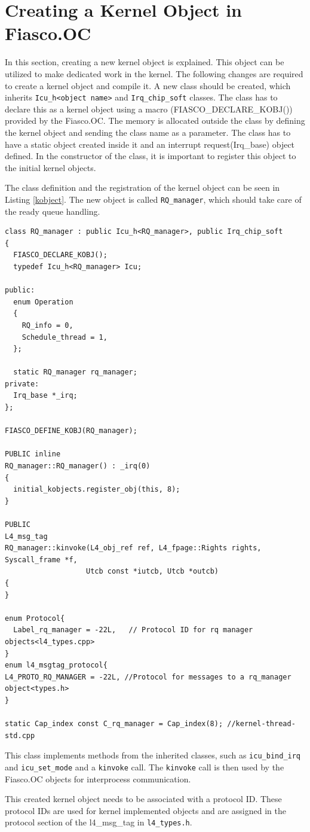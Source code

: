 \section{Creating a Kernel Object in Fiasco.OC}\label{implement:kernelobject}
In this section, creating a new kernel object is explained. This object can be utilized to make dedicated work in the kernel. The following changes are required to create a kernel object and compile it. A new class should be created, which inherits \texttt{Icu\_h<object name>} and
\texttt{Irq\_chip\_soft} classes. The class has to declare this as a kernel object using a macro (FIASCO\_DECLARE\_KOBJ()) provided by the Fiasco.OC. The memory is allocated outside the class by defining the kernel object and sending the class name as a parameter. The class has to have a static object created inside it and an interrupt request(Irq\_base) object defined. In the constructor of the class, it is important to register this object to the initial kernel objects. 

The class definition and the registration of the kernel object can be seen in Listing \ref{kobject}. The new object is called \texttt{RQ\_manager}, which should take care of the ready queue handling.

\begin{lstlisting}[caption={Creating new kernel object},label=kobject, style=customcpp]
class RQ_manager : public Icu_h<RQ_manager>, public Irq_chip_soft
{
  FIASCO_DECLARE_KOBJ();
  typedef Icu_h<RQ_manager> Icu;

public:
  enum Operation
  {
	RQ_info = 0,
	Schedule_thread = 1,
  };

  static RQ_manager rq_manager;
private:
  Irq_base *_irq;
};

FIASCO_DEFINE_KOBJ(RQ_manager);

PUBLIC inline
RQ_manager::RQ_manager() : _irq(0)
{
  initial_kobjects.register_obj(this, 8);
}

PUBLIC
L4_msg_tag
RQ_manager::kinvoke(L4_obj_ref ref, L4_fpage::Rights rights, Syscall_frame *f,
                   Utcb const *iutcb, Utcb *outcb)
{
}

enum Protocol{
  Label_rq_manager = -22L,   // Protocol ID for rq manager objects<l4_types.cpp>
}
enum l4_msgtag_protocol{
L4_PROTO_RQ_MANAGER = -22L, //Protocol for messages to a rq_manager object<types.h>
}

static Cap_index const C_rq_manager = Cap_index(8); //kernel-thread-std.cpp
\end{lstlisting}

This class implements methods from the inherited classes, such as \texttt{icu\_bind\_irq} and \texttt{icu\_set\_mode} and a \texttt{kinvoke} call. The \texttt{kinvoke} call is then used by the Fiasco.OC objects for interprocess communication.

This created kernel object needs to be associated with a protocol ID. These protocol IDs are used for kernel implemented objects and are assigned in the protocol section of the l4\_msg\_tag in \texttt{l4\_types.h}.